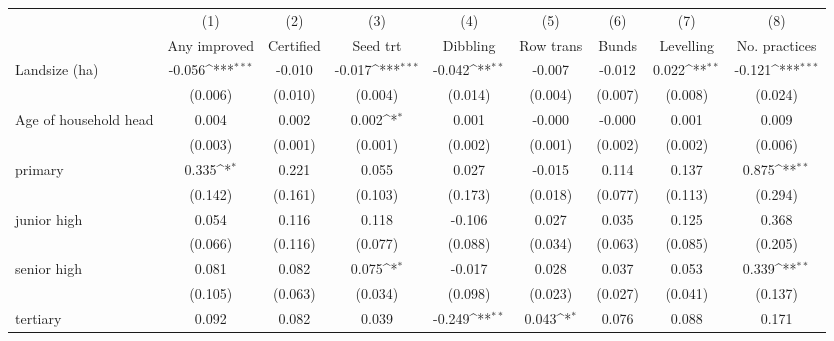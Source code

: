 {
\def\sym#1{\ifmmode^{#1}\else\(^{#1}\)\fi}
\begin{tabular}{l*{8}{c}}
\hline\hline
                    &\multicolumn{1}{c}{(1)}         &\multicolumn{1}{c}{(2)}         &\multicolumn{1}{c}{(3)}         &\multicolumn{1}{c}{(4)}         &\multicolumn{1}{c}{(5)}         &\multicolumn{1}{c}{(6)}         &\multicolumn{1}{c}{(7)}         &\multicolumn{1}{c}{(8)}         \\
                    &Any improved         &Certified         &Seed trt         &Dibbling         &Row trans         &Bunds         &Levelling         &No. practices         \\
\hline
Landsize (ha)       &-0.056\sym{***}&-0.010         &-0.017\sym{***}&-0.042\sym{**} &-0.007         &-0.012         &0.022\sym{**} &-0.121\sym{***}\\
                    &(0.006)         &(0.010)         &(0.004)         &(0.014)         &(0.004)         &(0.007)         &(0.008)         &(0.024)         \\
Age of household head&0.004         &0.002         &0.002\sym{*}  &0.001         &-0.000         &-0.000         &0.001         &0.009         \\
                    &(0.003)         &(0.001)         &(0.001)         &(0.002)         &(0.001)         &(0.002)         &(0.002)         &(0.006)         \\
primary             &0.335\sym{*}  &0.221         &0.055         &0.027         &-0.015         &0.114         &0.137         &0.875\sym{**} \\
                    &(0.142)         &(0.161)         &(0.103)         &(0.173)         &(0.018)         &(0.077)         &(0.113)         &(0.294)         \\
junior high         &0.054         &0.116         &0.118         &-0.106         &0.027         &0.035         &0.125         &0.368         \\
                    &(0.066)         &(0.116)         &(0.077)         &(0.088)         &(0.034)         &(0.063)         &(0.085)         &(0.205)         \\
senior high         &0.081         &0.082         &0.075\sym{*}  &-0.017         &0.028         &0.037         &0.053         &0.339\sym{**} \\
                    &(0.105)         &(0.063)         &(0.034)         &(0.098)         &(0.023)         &(0.027)         &(0.041)         &(0.137)         \\
tertiary            &0.092         &0.082         &0.039         &-0.249\sym{**} &0.043\sym{*}  &0.076         &0.088         &0.171         \\

\end{tabular}}
